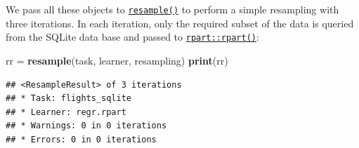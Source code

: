 \documentclass[]{scrbook}
\newenvironment{Shaded}{\begin{snugshade}}{\end{snugshade}}
\newcommand{\DataTypeTok}[1]{\textcolor[rgb]{0.13,0.29,0.53}{#1}}
\newcommand{\DecValTok}[1]{\textcolor[rgb]{0.00,0.00,0.81}{#1}}
\newcommand{\FloatTok}[1]{\textcolor[rgb]{0.00,0.00,0.81}{#1}}
\newcommand{\KeywordTok}[1]{\textcolor[rgb]{0.13,0.29,0.53}{\textbf{#1}}}
\newcommand{\NormalTok}[1]{#1}
\newcommand{\OperatorTok}[1]{\textcolor[rgb]{0.81,0.36,0.00}{\textbf{#1}}}
\newcommand{\StringTok}[1]{\textcolor[rgb]{0.31,0.60,0.02}{#1}}
\renewenvironment{Shaded} {\begin{snugshade}\small} {\end{snugshade}}
\begin{document}
\begin{Shaded}
\end{Shaded}

We pass all these objects to \href{https://mlr3.mlr-org.com/reference/resample.html}{\texttt{resample()}} to perform a simple resampling with three iterations.
In each iteration, only the required subset of the data is queried from the SQLite data base and passed to \href{https://www.rdocumentation.org/packages/rpart/topics/rpart}{\texttt{rpart::rpart()}}:

\begin{Shaded}
\begin{Highlighting}[]
\NormalTok{rr =}\StringTok{ }\KeywordTok{resample}\NormalTok{(task, learner, resampling)}
\KeywordTok{print}\NormalTok{(rr)}
\end{Highlighting}
\end{Shaded}

\begin{verbatim}
## <ResampleResult> of 3 iterations
## * Task: flights_sqlite
## * Learner: regr.rpart
## * Warnings: 0 in 0 iterations
## * Errors: 0 in 0 iterations
\end{verbatim}

\begin{Shaded}
\end{Shaded}
\end{document}
